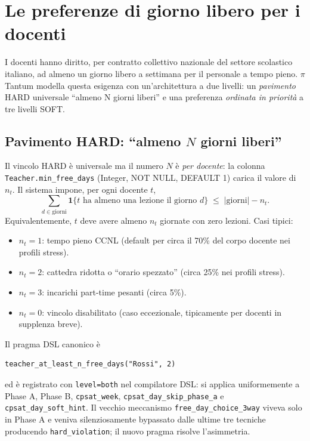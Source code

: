 \section{Le preferenze di giorno libero per i docenti}
\label{sec:vincoli-giorno-libero-docente}

I docenti hanno diritto, per contratto collettivo nazionale
del settore scolastico italiano, ad almeno un giorno libero
a settimana per il personale a tempo pieno. $\pi$Tantum
modella questa esigenza con un'architettura a due livelli:
un \emph{pavimento} HARD universale ``almeno N giorni
liberi'' e una preferenza \emph{ordinata in priorit\`a} a
tre livelli SOFT.

\subsection*{Pavimento HARD: ``almeno $N$ giorni liberi''}

Il vincolo HARD \`e universale ma il numero $N$ \`e
\emph{per docente}: la colonna
\texttt{Teacher.min\_free\_days} (Integer, NOT NULL, DEFAULT
1) carica il valore di $n_t$. Il sistema impone, per ogni
docente $t$,
\[
   \sum_{d \in \mathrm{giorni}} \mathbf{1}\{\text{$t$ ha almeno
   una lezione il giorno $d$}\}
   \;\le\; |\mathrm{giorni}| - n_t.
\]
Equivalentemente, $t$ deve avere almeno $n_t$ giornate con
zero lezioni. Casi tipici:
\begin{itemize}
  \item $n_t = 1$: tempo pieno CCNL (default per circa il
    70\% del corpo docente nei profili stress).
  \item $n_t = 2$: cattedra ridotta o ``orario spezzato''
    (circa 25\% nei profili stress).
  \item $n_t = 3$: incarichi part-time pesanti (circa 5\%).
  \item $n_t = 0$: vincolo disabilitato (caso eccezionale,
    tipicamente per docenti in supplenza breve).
\end{itemize}
Il pragma DSL canonico \`e
\begin{verbatim}
teacher_at_least_n_free_days("Rossi", 2)
\end{verbatim}
ed \`e registrato con \texttt{level=both} nel compilatore
DSL: si applica uniformemente a Phase A, Phase B,
\texttt{cpsat\_week}, \texttt{cpsat\_day\_skip\_phase\_a} e
\texttt{cpsat\_day\_soft\_hint}. Il vecchio meccanismo
\texttt{free\_day\_choice\_3way} viveva solo in Phase A e
veniva silenziosamente bypassato dalle ultime tre tecniche
producendo \texttt{hard\_violation}; il nuovo pragma
risolve l'asimmetria.

